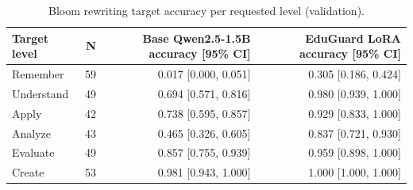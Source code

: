 \begin{table}[t]
\centering
\caption{Bloom rewriting target accuracy per requested level (validation).}
\label{tab:t4_bloom_per_level}
\begin{tabular}{lrrr}
\toprule
Target level & N & Base Qwen2.5-1.5B accuracy [95\% CI] & EduGuard LoRA accuracy [95\% CI] \\
\midrule
Remember & 59 & 0.017 [0.000, 0.051] & 0.305 [0.186, 0.424] \\
Understand & 49 & 0.694 [0.571, 0.816] & 0.980 [0.939, 1.000] \\
Apply & 42 & 0.738 [0.595, 0.857] & 0.929 [0.833, 1.000] \\
Analyze & 43 & 0.465 [0.326, 0.605] & 0.837 [0.721, 0.930] \\
Evaluate & 49 & 0.857 [0.755, 0.939] & 0.959 [0.898, 1.000] \\
Create & 53 & 0.981 [0.943, 1.000] & 1.000 [1.000, 1.000] \\
\bottomrule
\end{tabular}
\end{table}
